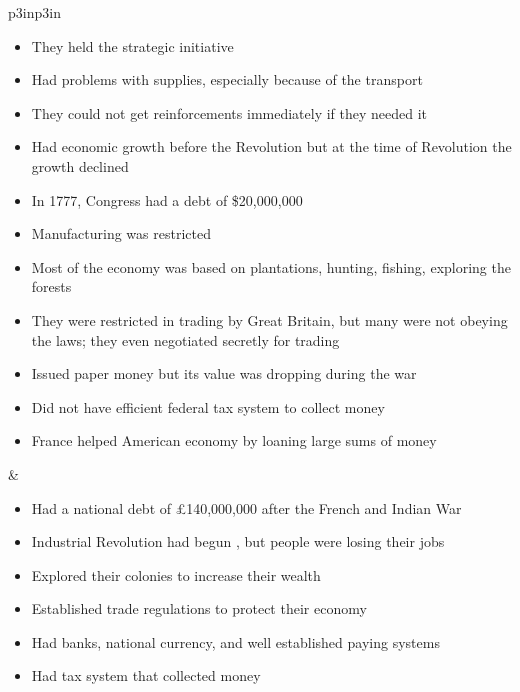 \begin{singlespace}
\begin{mpxtabular}{p{3in}p{3in}}
\begin{itemize}[nolistsep,leftmargin=*]
	      of diseases \cite[p.62]{stewart_2005} 
	    \item  They held the strategic initiative
	      \cite[p.540]{mackesy1962british} 
	    \item  Had problems with supplies, especially because of the
	      transport \cite[p.541]{mackesy1962british}\cite[62]{stewart_2005} 
	    \item  They could not get reinforcements immediately if they needed it
	\end{itemize}\ML
	\ML
	\begin{itemize}[nolistsep,leftmargin=*]
	     \item Had economic growth before the Revolution
	       \cite[77,91]{ladenburg_causes_1989} but at the time of Revolution the growth declined
	     \item In 1777, Congress had a debt of \$20,000,000
	       \cite[p.102]{stephenson_patriot_2007}
	       \cite[34]{higginbotham_daniel_1961}
	     \item Manufacturing was restricted
	       \cite[p.76]{ladenburg_causes_1989}
	     \item Most of the economy was based on plantations, hunting,
	       fishing, exploring the forests \cite[p.75]{ladenburg_causes_1989} 
	     \item They were restricted in trading by Great Britain, but many
	       were not obeying the laws; they even negotiated secretly for
	       trading \cite[p.229]{higginbotham_daniel_1961}
	     \item Issued paper money but its value  was dropping during the war
	       \cite[p.27]{stephenson_patriot_2007}
	     \item Did not have efficient federal tax system to collect money 
	     \item France helped American economy by loaning large sums of money
	       \cite[p.233]{higginbotham_daniel_1961}
	\end{itemize}
	&
	\begin{itemize}[nolistsep,leftmargin=*]
	    \item Had a national debt of £140,000,000 after the French and
	      Indian War\cite[p.88]{ladenburg_causes_1989} 
	    \item Industrial Revolution had begun \cite[p.37]{pancake_1985}, but
	      people were losing their jobs \cite[p.37]{stephenson_patriot_2007} 
	    \item Explored their colonies to increase their wealth
	      \cite[p.75]{ladenburg_causes_1989} 
	    \item Established trade regulations to protect their economy
	      \cite[p.76]{ladenburg_causes_1989} 
	    \item Had banks, national currency, and well established paying systems 
	    \item Had tax system that collected money 
	\end{itemize}\ML
      \end{mpxtabular}
\end{singlespace}
%
